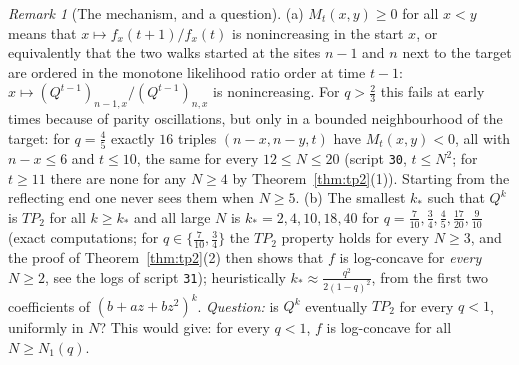 \documentclass[11pt,a4paper]{article}
\theoremstyle{definition}
\theoremstyle{remark}
\newtheorem{remark}[theorem]{Remark}
\begin{document}
\begin{remark}[The mechanism, and a question]\label{rem:tp2}
(a) $M_t(x,y)\ge0$ for all $x<y$ means that $x\mapsto f_x(t+1)/f_x(t)$ is nonincreasing in the start $x$, or
equivalently that the two walks started at the sites $n-1$ and $n$ next to the target are ordered in the monotone
likelihood ratio order at time $t-1$: $x\mapsto(Q^{t-1})_{n-1,x}/(Q^{t-1})_{n,x}$ is nonincreasing. For $q>\frac23$
this fails at early times because of parity oscillations, but only in a bounded neighbourhood of the target: for
$q=\frac45$ exactly $16$ triples $(n-x,n-y,t)$ have $M_t(x,y)<0$, all with $n-x\le6$ and $t\le10$, the same for
every $12\le N\le20$ (script \texttt{30}, $t\le N^2$; for $t\ge11$ there are none for any $N\ge4$ by
Theorem~\ref{thm:tp2}(1)). Starting from the reflecting end one never sees them when $N\ge5$.
(b) The smallest $k_*$ such that $Q^k$ is $TP_2$ for all $k\ge k_*$ and all large $N$ is $k_*=2,4,10,18,40$ for
$q=\frac7{10},\frac34,\frac45,\frac{17}{20},\frac9{10}$ (exact computations; for $q\in\{\frac7{10},\frac34\}$ the $TP_2$ property holds for every $N\ge3$, and the proof of
Theorem~\ref{thm:tp2}(2) then shows that $f$ is log-concave for \emph{every} $N\ge2$, see the logs of
script \texttt{31}); heuristically $k_*\approx\frac{q^2}{2(1-q)^2}$, from the first two coefficients of
$(b+az+bz^2)^k$. \emph{Question:} is $Q^k$ eventually $TP_2$ for every $q<1$, uniformly in $N$? This would give: for
every $q<1$, $f$ is log-concave for all $N\ge N_1(q)$.
\end{remark}
\end{document}
